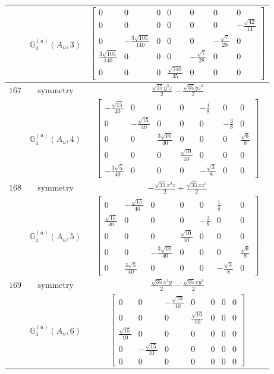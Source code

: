 \documentclass[fleqn,8pt,landscape]{jsarticle}
\begin{document}
\begin{longtable}{ccc}
$  $ & $ \mathbb{G}_{4}^{(a)}(A_{u},3) $ & $ \begin{bmatrix} 0 & 0 & 0 & 0 & 0 & 0 & 0 \\ 0 & 0 & 0 & 0 & 0 & 0 & - \frac{\sqrt{42}}{14} \\ 0 & - \frac{3 \sqrt{105}}{140} & 0 & 0 & 0 & - \frac{\sqrt{7}}{28} & 0 \\ \frac{3 \sqrt{105}}{140} & 0 & 0 & 0 & - \frac{\sqrt{7}}{28} & 0 & 0 \\ 0 & 0 & 0 & \frac{\sqrt{210}}{35} & 0 & 0 & 0 \end{bmatrix} $ \\ \hline
$ 167 $ & $ \text{symmetry} $ & $ \frac{\sqrt{35} y^{3} z}{2} - \frac{\sqrt{35} y z^{3}}{2} $ \\
$  $ & $ \mathbb{G}_{4}^{(a)}(A_{u},4) $ & $ \begin{bmatrix} - \frac{\sqrt{15}}{40} & 0 & 0 & 0 & - \frac{1}{8} & 0 & 0 \\ 0 & - \frac{\sqrt{15}}{40} & 0 & 0 & 0 & - \frac{3}{8} & 0 \\ 0 & 0 & \frac{3 \sqrt{10}}{40} & 0 & 0 & 0 & \frac{\sqrt{6}}{8} \\ 0 & 0 & 0 & \frac{\sqrt{10}}{10} & 0 & 0 & 0 \\ - \frac{3 \sqrt{5}}{40} & 0 & 0 & 0 & - \frac{\sqrt{3}}{8} & 0 & 0 \end{bmatrix} $ \\ \hline
$ 168 $ & $ \text{symmetry} $ & $ - \frac{\sqrt{35} x^{3} z}{2} + \frac{\sqrt{35} x z^{3}}{2} $ \\
$  $ & $ \mathbb{G}_{4}^{(a)}(A_{u},5) $ & $ \begin{bmatrix} 0 & - \frac{\sqrt{15}}{40} & 0 & 0 & 0 & \frac{1}{8} & 0 \\ \frac{\sqrt{15}}{40} & 0 & 0 & 0 & - \frac{3}{8} & 0 & 0 \\ 0 & 0 & 0 & \frac{\sqrt{10}}{10} & 0 & 0 & 0 \\ 0 & 0 & - \frac{3 \sqrt{10}}{40} & 0 & 0 & 0 & \frac{\sqrt{6}}{8} \\ 0 & \frac{3 \sqrt{5}}{40} & 0 & 0 & 0 & - \frac{\sqrt{3}}{8} & 0 \end{bmatrix} $ \\ \hline
$ 169 $ & $ \text{symmetry} $ & $ \frac{\sqrt{35} x^{3} y}{2} - \frac{\sqrt{35} x y^{3}}{2} $ \\
$  $ & $ \mathbb{G}_{4}^{(a)}(A_{u},6) $ & $ \begin{bmatrix} 0 & 0 & - \frac{\sqrt{10}}{10} & 0 & 0 & 0 & 0 \\ 0 & 0 & 0 & \frac{\sqrt{10}}{10} & 0 & 0 & 0 \\ \frac{\sqrt{15}}{10} & 0 & 0 & 0 & 0 & 0 & 0 \\ 0 & - \frac{\sqrt{15}}{10} & 0 & 0 & 0 & 0 & 0 \\ 0 & 0 & 0 & 0 & 0 & 0 & 0 \end{bmatrix} $ \\ \hline

\end{longtable}
\end{document}
